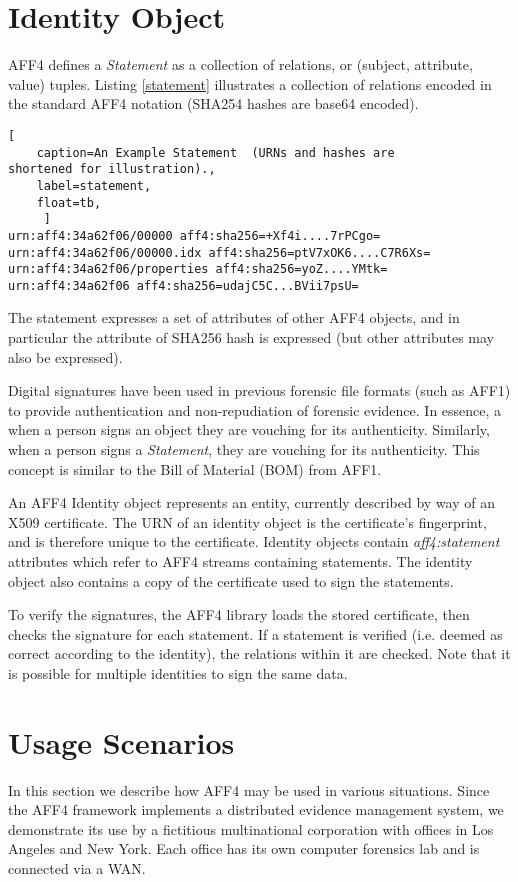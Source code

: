 \documentclass[10pt, conference]{IEEEtran}
\begin{document}
\section{Identity Object}
AFF4 defines a \emph{Statement} as a collection of relations, or
(subject, attribute, value) tuples. Listing \ref{statement}
illustrates a collection of relations encoded in the standard AFF4
notation (SHA254 hashes are base64 encoded).

\begin{lstlisting}[
	caption=An Example Statement  (URNs and hashes are
shortened for illustration).,
	label=statement,
	float=tb,
	 ]
urn:aff4:34a62f06/00000 aff4:sha256=+Xf4i....7rPCgo=
urn:aff4:34a62f06/00000.idx aff4:sha256=ptV7xOK6....C7R6Xs=
urn:aff4:34a62f06/properties aff4:sha256=yoZ....YMtk=
urn:aff4:34a62f06 aff4:sha256=udajC5C...BVii7psU=
\end{lstlisting}

The statement expresses a set of attributes of other AFF4 objects, and
in particular the attribute of SHA256 hash is expressed (but other
attributes may also be expressed).

Digital signatures have been used in previous forensic file formats
(such as AFF1) to provide authentication and non-repudiation of
forensic evidence. In essence, a when a person signs an object they
are vouching for its authenticity. Similarly, when a person signs a
\emph{Statement}, they are vouching for its authenticity. This concept
is similar to the Bill of Material (BOM) from AFF1.

An AFF4 Identity object represents an entity, currently described by
way of an X509 certificate. The URN of an identity object is the
certificate's fingerprint, and is therefore unique to the
certificate. Identity objects contain \emph{aff4:statement}
attributes which refer to AFF4 streams containing statements. The
identity object also contains a copy of the certificate used to sign
the statements.

To verify the signatures, the AFF4 library loads the stored
certificate, then checks the signature for each statement. If a
statement is verified (i.e. deemed as correct according to the
identity), the relations within it are checked. Note that it is possible
for multiple identities to sign the same data.

\section{Usage Scenarios}
In this section we describe how AFF4 may be used in various
situations. Since the AFF4 framework implements a distributed evidence
management system, we demonstrate its use by a fictitious
multinational corporation with offices in Los Angeles and New
York. Each office has its own computer forensics lab and is connected
via a WAN.
\end{document}
